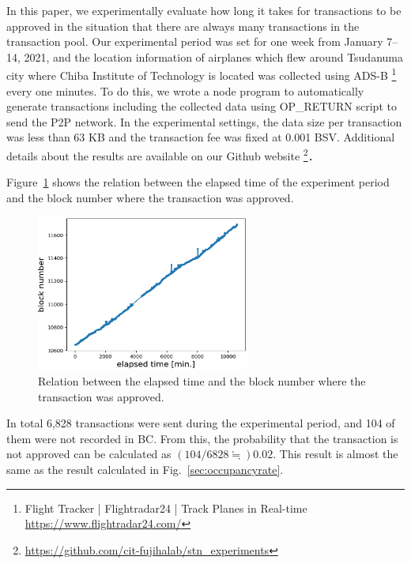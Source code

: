 \documentclass[graybox]{svmult}
\begin{document}
In this paper, we experimentally evaluate how long it takes for transactions to be approved in the situation that there are always many transactions in the transaction pool. 
Our experimental period was set for one week from January 7--14, 2021, and the location information of airplanes which flew around Tsudanuma city where Chiba Institute of Technology is located was collected using ADS-B \footnote{Flight Tracker | Flightradar24 | Track Planes in Real-time \url{https://www.flightradar24.com/}} every one minutes. 
To do this, we wrote a node program to automatically generate transactions including the collected data using OP\_RETURN script to send the P2P network. 
In the experimental settings, the data size per transaction was less than 63 KB and the transaction fee was fixed at 0.001 BSV. 
Additional details about the results are available on our Github website 
\footnote{\url{https://github.com/cit-fujihalab/stn_experiments}}．


Figure~\ref{fig:exp3-1} shows the relation between the elapsed time of the experiment period and the block number where the transaction was approved. 
%
\begin{figure}[tb]
  \begin{center}
    \includegraphics[width=70mm]{exp3-1.eps}
  \end{center}
  \caption{Relation between the elapsed time and the block number where the transaction was approved.}
  \label{fig:exp3-1}
\end{figure}
%
In total 6,828 transactions were sent during the experimental period, and 104 of them were not recorded in BC. 
From this, the probability that the transaction is not approved can be calculated as $(104/6828 \fallingdotseq) 0.02$.
This result is almost the same as the result calculated in Fig.~\ref{sec:occupancyrate}. 
\end{document}
